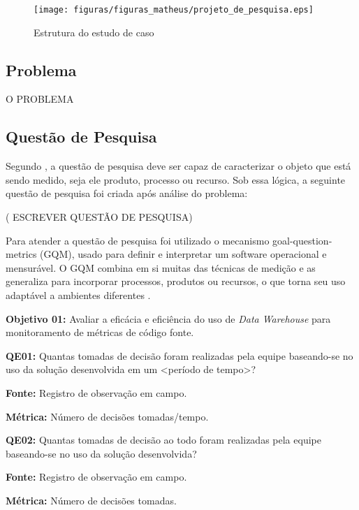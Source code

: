 \begin{figure}[h!]
\centering
\texttt{[image: figuras/figuras\_matheus/projeto\_de\_pesquisa.eps]}
\caption{Estrutura do estudo de caso}
\label{fig:pesquisa}
\end{figure}
\FloatBarrier

\subsection{Problema}

O PROBLEMA 


\subsection{Questão de Pesquisa}

Segundo , a questão de pesquisa deve ser capaz de caracterizar o objeto que está sendo medido, seja ele produto, processo ou recurso. Sob essa lógica, a seguinte questão de pesquisa foi criada após análise do problema:

( ESCREVER QUESTÃO DE PESQUISA)

Para atender a questão de pesquisa foi utilizado o mecanismo goal-question-metrics (GQM), usado para definir e interpretar um software operacional e mensurável. O GQM combina em si muitas das técnicas de medição e as generaliza para incorporar processos, produtos ou recursos, o que torna seu uso adaptável a ambientes diferentes \cite{caldiera_goal_1994}. 


\textbf{Objetivo 01:} Avaliar a eficácia e eficiência do uso de \textit{Data Warehouse} para monitoramento de métricas de código fonte.


\textbf{QE01:} Quantas tomadas de decisão foram realizadas pela equipe baseando-se no uso da solução desenvolvida em um <período de tempo>?

\textbf{Fonte:} Registro de observação em campo.

\textbf{Métrica:} Número de decisões tomadas/tempo.


\textbf{QE02: } Quantas tomadas de decisão ao todo foram realizadas pela equipe baseando-se no uso da solução desenvolvida?

\textbf{Fonte:} Registro de observação em campo.

\textbf{Métrica:} Número de decisões tomadas.

